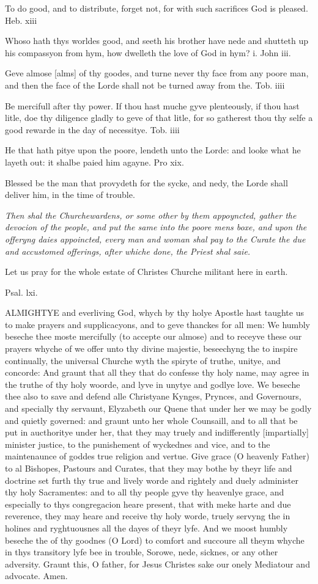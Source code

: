 To do good, and to distribute, forget not, for with such sacrifices God
is pleased. Heb. xiii

Whoso hath thys worldes good, and seeth his brother have nede and shutteth
up his compassyon from hym, how dwelleth the love of God in hym? i.
John iii.

Geve almose [alms] of thy goodes,
and turne never thy face from any poore man, and then the face of the
Lorde shall not be turned away from the. Tob.
iiii

Be mercifull after thy power. If thou hast muche gyve plenteously, if
thou hast litle, doe thy diligence gladly to geve of that litle, for so
gatherest thou thy selfe a good rewarde in the day of necessitye. Tob.
iiii

He that hath pitye upon the poore, lendeth unto the Lorde: and looke what
he layeth out: it shalbe paied him agayne. Pro
xix.

Blessed be the man that provydeth for the sycke, and nedy, the Lorde shall
deliver him, in the time of trouble.

\emph{Then
shal the Churchewardens, or some other by them appoyncted, gather the
devocion of the people, and put the same into the poore mens boxe, and
upon the offeryng daies appoincted, every man and woman shal pay to the
Curate the due and accustomed offerings, after whiche done, the Priest
shal saie.}

Let us pray for the whole estate of Christes Churche militant here in
earth.

Psal.
lxi.

ALMIGHTYE
and everliving God, whych by thy holye Apostle hast taughte us to make
prayers and supplicacyons, and to geve thanckes for all men: We humbly
beseche thee moste mercifully (to accepte our almose) and to receyve these
our prayers whyche of we offer unto thy divine majestie, beseechyng the
to inspire continually, the universal Churche wyth the spiryte of truthe,
unitye, and concorde: And graunt that all they that do confesse thy holy
name, may agree in the truthe of thy holy woorde, and lyve in unytye and
godlye love. We beseche thee also to save and defend alle Christyane Kynges,
Prynces, and Governours, and specially thy servaunt, Elyzabeth our Quene
that under her we may be godly and quietly governed: and graunt unto her
whole Counsaill, and to all that be put in aucthoritye under her, that
they may truely and indifferently [impartially]
minister justice, to the punishement of wyckednes and vice, and
to the maintenaunce of goddes true religion and vertue. Give grace (O
heavenly Father) to al Bishopes, Pastours and Curates, that they may bothe
by theyr life and doctrine set furth thy true and lively worde and rightely
and duely administer thy holy Sacramentes: and to all thy people gyve
thy heavenlye grace, and especially to thys congregacion heare present,
that with meke harte and due reverence, they may heare and receive thy
holy worde, truely servyng the in holines and ryghtuousnes all the dayes
of theyr lyfe. And we moost humbly beseche the of thy goodnes (O Lord)
to comfort and succoure all theym whyche in thys transitory lyfe bee in
trouble, Sorowe, nede, sicknes, or any other adversity. Graunt this, O
father, for Jesus Christes sake our onely Mediatour and advocate. Amen.

